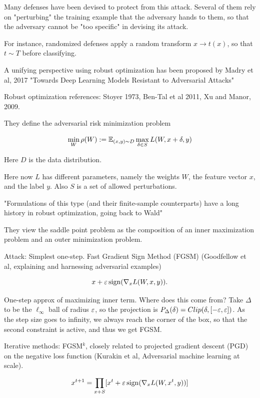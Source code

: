 \documentclass[english]{article}
\begin{document}
\item Many defenses have been devised to protect from this attack. Several of them rely on "perturbing" the training example that the adversary hands to them, so that the adversary cannot be "too specific" in devising its attack. 

For instance, randomized defenses apply a random transform $x\to t(x)$, so that $t\sim T$ before classifying.

\item A unifying perspective using robust optimization has been proposed by Madry et al, 2017 "Towards Deep Learning Models Resistant to Adversarial Attacks"

Robust optimization references: Stoyer 1973, Ben-Tal et al 2011, Xu and Manor, 2009. 

They define the adversarial risk minimization problem

$$
\min_W \rho(W):=\mathbb{E}_{(x,y)\sim D} \max_{\delta\in S} L(W,x+\delta,y)
$$

Here $D$ is the data distribution.

Here now $L$ has different parameters, namely the weights $W$, the feature vector $x$, and the label $y$. Also $S$ is a set of allowed perturbations. 

"Formulations of this type (and their finite-sample counterparts) have a long history in robust optimization, going back to Wald"

They view the saddle point problem as the composition of an inner maximization problem and an outer minimization problem.

\benum 
\item  Attack: Simplest one-step. Fast Gradient Sign Method (FGSM) (Goodfellow et al, explaining and harnessing adversarial examples)

$$x + \varepsilon \operatorname{sign}(\nabla_x L(W,x,y)).$$

One-step approx of maximizing inner term. Where does this come from? Take $\Delta$ to be the $\ell_\infty$ ball of radius $\varepsilon$, so the projection is $P_\Delta(\delta) = Clip(\delta,[-\varepsilon,\varepsilon])$. As the step size goes to infinity, we always reach the corner of the box, so that the second constraint is active, and thus we get FGSM.

Iterative methods: FGSM$^k$, closely related to projected gradient descent (PGD) on the negative loss function (Kurakin et al, Adversarial machine learning at scale). 

$$x^{t+1} = \prod_{x+S}[x^t+ \varepsilon \operatorname{sign}(\nabla_x L(W,x^t,y))]$$ 
\end{document}
